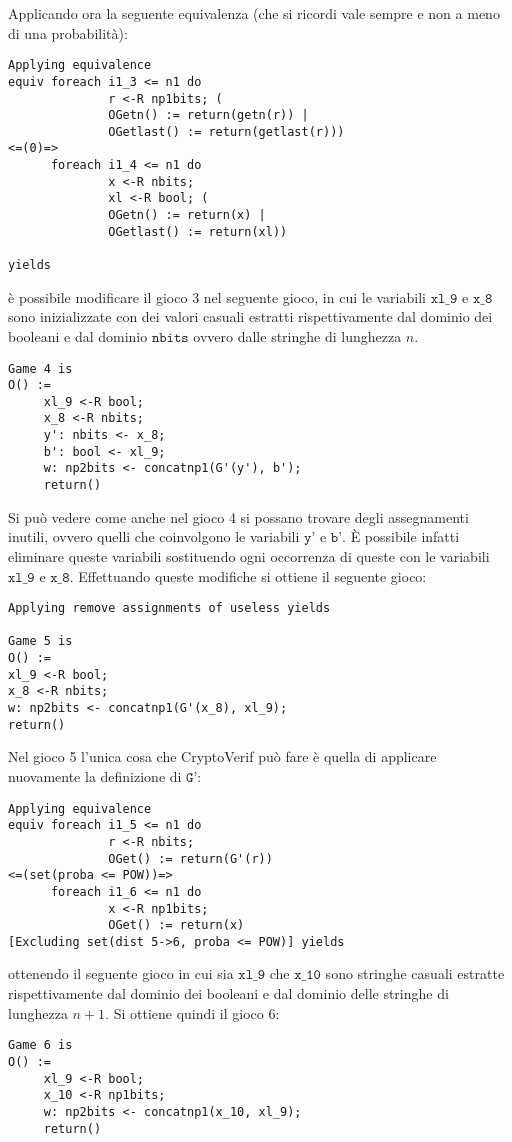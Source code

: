 \documentclass[a4paper,openright,twoside,12pt]{report}
\begin{document}
Applicando ora la seguente equivalenza (che si ricordi vale sempre e non a meno di una probabilit\`a):
\begin{verbatim} 
Applying equivalence
equiv foreach i1_3 <= n1 do 
              r <-R np1bits; (
              OGetn() := return(getn(r)) |
              OGetlast() := return(getlast(r)))
<=(0)=>
      foreach i1_4 <= n1 do 
              x <-R nbits; 
              xl <-R bool; (
              OGetn() := return(x) |
              OGetlast() := return(xl))

yields
\end{verbatim}
\`e possibile modificare il gioco 3 nel seguente gioco, in cui le variabili $\texttt{xl\_9}$ e $\texttt{x\_8}$ sono inizializzate con dei valori casuali estratti rispettivamente dal dominio dei booleani e dal dominio
$\texttt{nbits}$ ovvero dalle stringhe di lunghezza $n$.
\begin{verbatim} 
Game 4 is
O() :=
     xl_9 <-R bool;
     x_8 <-R nbits;
     y': nbits <- x_8;
     b': bool <- xl_9;
     w: np2bits <- concatnp1(G'(y'), b');
     return()
\end{verbatim}
Si pu\`o vedere come anche nel gioco 4 si possano trovare degli assegnamenti inutili, ovvero quelli che coinvolgono le variabili $\texttt{y'}$ e $\texttt{b'}$. \`E possibile infatti eliminare queste variabili
sostituendo ogni occorrenza di queste con le variabili $\texttt{xl\_9}$ e $\texttt{x\_8}$. Effettuando queste modifiche si ottiene il seguente gioco:
\begin{verbatim} 
Applying remove assignments of useless yields

Game 5 is
O() :=
xl_9 <-R bool;
x_8 <-R nbits;
w: np2bits <- concatnp1(G'(x_8), xl_9);
return()
\end{verbatim}
Nel gioco 5 l'unica cosa che CryptoVerif pu\`o fare \`e quella di applicare nuovamente la definizione di $\texttt{G'}$:
\begin{verbatim}
Applying equivalence
equiv foreach i1_5 <= n1 do 
              r <-R nbits; 
              OGet() := return(G'(r))
<=(set(proba <= POW))=>
      foreach i1_6 <= n1 do 
              x <-R np1bits; 
              OGet() := return(x)
[Excluding set(dist 5->6, proba <= POW)] yields
\end{verbatim}
ottenendo il seguente gioco in cui sia $\texttt{xl\_9}$ che $\texttt{x\_10}$ 
sono stringhe casuali estratte rispettivamente dal dominio dei booleani e dal dominio delle stringhe di lunghezza $n+1$. 
Si ottiene quindi il gioco 6:
\begin{verbatim}
Game 6 is
O() :=
     xl_9 <-R bool;
     x_10 <-R np1bits;
     w: np2bits <- concatnp1(x_10, xl_9);
     return()
\end{verbatim}
\end{document}

